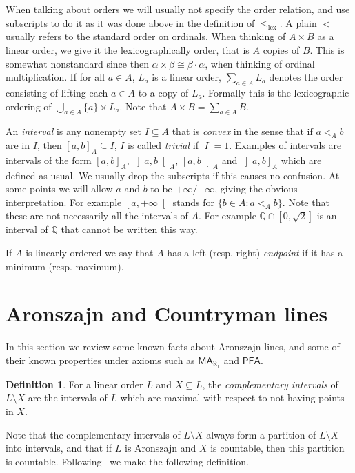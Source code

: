 \documentclass[10pt]{amsart}
\theoremstyle{definition}
\newtheorem{definition}[theorem]{Definition}
\theoremstyle{remark}
\newcommand{\seb}{\subseteq}
\newcommand{\setm}{\setminus}
\newcommand{\axiom}[1]{\mathsf{#1}}
\newcommand{\MA}{\axiom{MA}}
\newcommand{\PFA}{\axiom{PFA}}
\newcommand\lex{\mathrm{lex}}
\newcommand{\1}{\mathbbm{1}}
\begin{document}
When talking about orders we will usually not specify the order relation,
and use subscripts to do it as it was done above in the definition
of $\le_{\lex}$. A plain $<$ usually refers to the standard order
on ordinals.
When thinking of $A \times B$ as a linear order, we give it the
lexicographically order, that is $A$ copies of $B$.
This is somewhat nonstandard since then
$\alpha \times \beta \cong \beta \cdot \alpha$, when thinking of
ordinal multiplication. If for all $a \in A$, $L_{a}$ is a
linear order, $\sum_{a \in A}L_{a}$ denotes the order consisting
of lifting each $a \in A$ to a copy of $L_{a}$. Formally
this is the lexicographic ordering of
$\bigcup_{a \in A}\{a\} \times L_{a}$. Note that $A \times B = \sum_{a \in A}B$.

An \emph{interval}
is any nonempty set $I \seb A$ that is \emph{convex} in the sense that
if $a <_{A} b$ are in $I$, then ${[a,b]}_{A} \seb I$, $I$ is called
\emph{trivial} if $|I| = 1$. Examples of intervals
are intervals of the form ${[a,b]}_{A}$, ${\left]a,b\right[}_{A}$,
${\left[a,b\right[}_{A}$ and ${\left]a,b\right]}_{A}$ which are
defined as usual. We usually drop the subscripts if this causes no confusion.
At some points we will allow $a$ and $b$ to be $+\infty$/$-\infty$,
giving the obvious interpretation. For example
$\left[a,+\infty \right[$ stands for $\{b \in A : a <_{A}b\}$.
Note that these are not necessarily all
the intervals of $A$. For example $\mathbb{Q} \cap [0,\sqrt{2}]$ is an interval
of $\mathbb{Q}$ that cannot be written this way.

If $A$ is linearly ordered we say that $A$ has a left
(resp. right) \emph{endpoint} if it has a minimum (resp. maximum).

\section{Aronszajn and Countryman lines}\label{sec:prelim}

In this section we review some known facts about Aronszajn lines, and
some of their known properties under axioms such as $\MA_{\aleph_{1}}$
and $\PFA$.

\begin{definition}
  For a linear order $L$ and $X \seb L$, the \emph{complementary intervals}
  of $L \setm X$ are the intervals of $L$
  which are maximal with respect to not
  having points in $X$.
\end{definition}

Note that the complementary intervals of $L \setm X$ always form a
partition of $L \setm X$ into intervals, and that if $L$ is Aronszajn
and $X$ is countable, then this partition is countable.
Following~\cite{TodorcevicWalks} we make the
following definition.
\end{document}
